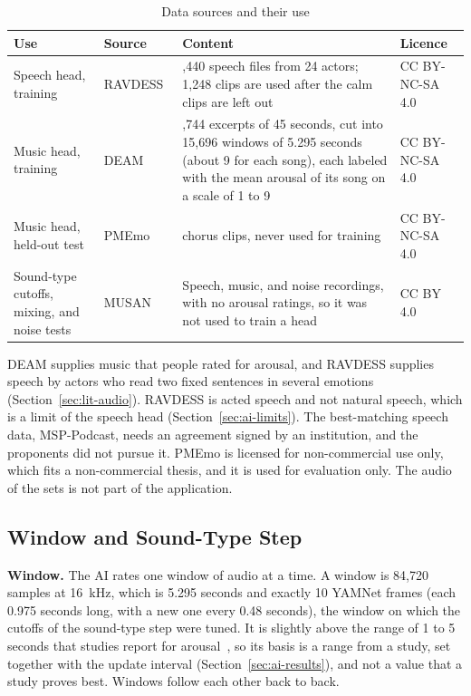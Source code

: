 \begin{table}[htbp]
    \centering
    \caption{Data sources and their use}\label{tab:ai-sources}
    \small
    \renewcommand{\arraystretch}{1.2}
    \begin{tabular}{|>{\raggedright\arraybackslash}p{}|>{\raggedright\arraybackslash}p{}|>{\raggedright\arraybackslash}p{}|>{\raggedright\arraybackslash}p{}|}
        \hline
        \textbf{Use} & \textbf{Source} & \textbf{Content} & \textbf{Licence} \\
        \hline
        Speech head, training & RAVDESS~\cite{livingstone2018ravdess} & 1,440 speech files from 24 actors; 1,248 clips are used after the calm clips are left out & CC BY-NC-SA 4.0 \\
        \hline
        Music head, training & DEAM~\cite{aljanaki2017deam} & 1,744 excerpts of 45 seconds, cut into 15,696 windows of 5.295 seconds (about 9 for each song), each labeled with the mean arousal of its song on a scale of 1 to 9 & CC BY-NC-SA 4.0 \\
        \hline
        Music head, held-out test & PMEmo~\cite{zhang2018pmemo} & 767 chorus clips, never used for training & CC BY-NC-SA 4.0 \\
        \hline
        Sound-type cutoffs, mixing, and noise tests & MUSAN~\cite{snyder2015musan} & Speech, music, and noise recordings, with no arousal ratings, so it was not used to train a head & CC BY 4.0 \\
        \hline
    \end{tabular}
\end{table}

DEAM supplies music that people rated for arousal, and RAVDESS supplies speech by actors who read two fixed sentences in several emotions (Section~\ref{sec:lit-audio}). RAVDESS is acted speech and not natural speech, which is a limit of the speech head (Section~\ref{sec:ai-limits}). The best-matching speech data, MSP-Podcast, needs an agreement signed by an institution, and the proponents did not pursue it. PMEmo is licensed for non-commercial use only, which fits a non-commercial thesis, and it is used for evaluation only. The audio of the sets is not part of the application.

\subsection{Window and Sound-Type Step}
\label{sec:ai-window}
\textbf{Window.} The AI rates one window of audio at a time. A window is 84,720 samples at 16~kHz, which is 5.295 seconds and exactly 10 YAMNet frames (each 0.975 seconds long, with a new one every 0.48 seconds), the window on which the cutoffs of the sound-type step were tuned. It is slightly above the range of 1 to 5 seconds that studies report for arousal~\cite{sun2023segmented}, so its basis is a range from a study, set together with the update interval (Section~\ref{sec:ai-results}), and not a value that a study proves best. Windows follow each other back to back.

